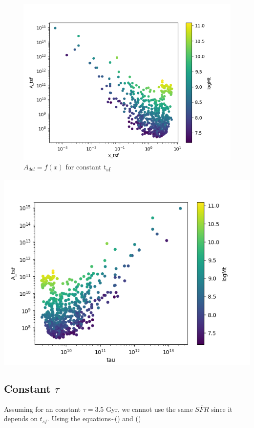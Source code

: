 \documentclass[a4paper,twocolumn]{article}
\begin{document}
\begin{figure}[!htpb]
\centering
\includegraphics[width=.9\linewidth]{./figs/x-A_tsf.png}
\caption{\label{fig:$A_{del} = f(x)$ for constant t_{sf}}\(A_{del} = f(x)\) for constant t\textsubscript{sf}}
\end{figure}

\begin{center}
\includegraphics[width=.9\linewidth]{figs/T-A_tsf.png}
\end{center}


\subsection{Constant \(\tau\)}
\label{sec:org3a3fe8a}

Assuming for an constant \(\tau=3.5\) Gyr, we cannot use the same \(\overline{SFR}\) since it depends on \(t_{sf}\). Using the equations\textasciitilde{}() and ()
\end{document}
